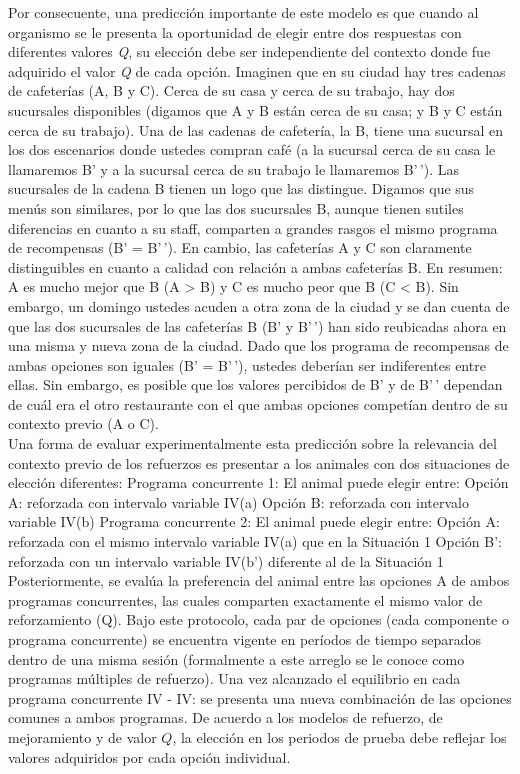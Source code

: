 \documentclass[
  letterpaper,
]{book}
\begin{document}
Por consecuente, una predicción importante de este modelo es que cuando
al organismo se le presenta la oportunidad de elegir entre dos
respuestas con diferentes valores \emph{Q}, su elección debe ser
independiente del contexto donde fue adquirido el valor \emph{Q} de cada
opción. Imaginen que en su ciudad hay tres cadenas de cafeterías (A, B y
C). Cerca de su casa y cerca de su trabajo, hay dos sucursales
disponibles (digamos que A y B están cerca de su casa; y B y C están
cerca de su trabajo). Una de las cadenas de cafetería, la B, tiene una
sucursal en los dos escenarios donde ustedes compran café (a la sucursal
cerca de su casa le llamaremos B' y a la sucursal cerca de su trabajo le
llamaremos B'\,'). Las sucursales de la cadena B tienen un logo que las
distingue. Digamos que sus menús son similares, por lo que las dos
sucursales B, aunque tienen sutiles diferencias en cuanto a su staff,
comparten a grandes rasgos el mismo programa de recompensas (B' =
B'\,'). En cambio, las cafeterías A y C son claramente distinguibles en
cuanto a calidad con relación a ambas cafeterías B. En resumen: A es
mucho mejor que B (A \textgreater{} B) y C es mucho peor que B (C
\textless{} B). Sin embargo, un domingo ustedes acuden a otra zona de la
ciudad y se dan cuenta de que las dos sucursales de las cafeterías B (B'
y B'\,') han sido reubicadas ahora en una misma y nueva zona de la
ciudad. Dado que los programa de recompensas de ambas opciones son
iguales (B' = B'\,'), ustedes deberían ser indiferentes entre ellas. Sin
embargo, es posible que los valores percibidos de B' y de B'\,' dependan
de cuál era el otro restaurante con el que ambas opciones competían
dentro de su contexto previo (A o C).\\
Una forma de evaluar experimentalmente esta predicción sobre la
relevancia del contexto previo de los refuerzos es presentar a los
animales con dos situaciones de elección diferentes: Programa
concurrente 1: El animal puede elegir entre: Opción A: reforzada con
intervalo variable IV(a) Opción B: reforzada con intervalo variable
IV(b) Programa concurrente 2: El animal puede elegir entre: Opción A:
reforzada con el mismo intervalo variable IV(a) que en la Situación 1
Opción B': reforzada con un intervalo variable IV(b') diferente al de la
Situación 1 Posteriormente, se evalúa la preferencia del animal entre
las opciones A de ambos programas concurrentes, las cuales comparten
exactamente el mismo valor de reforzamiento (Q). Bajo este protocolo,
cada par de opciones (cada componente o programa concurrente) se
encuentra vigente en períodos de tiempo separados dentro de una misma
sesión (formalmente a este arreglo se le conoce como programas múltiples
de refuerzo). Una vez alcanzado el equilibrio en cada programa
concurrente IV - IV: se presenta una nueva combinación de las opciones
comunes a ambos programas. De acuerdo a los modelos de refuerzo, de
mejoramiento y de valor \(Q\), la elección en los periodos de prueba
debe reflejar los valores adquiridos por cada opción individual.
\end{document}
